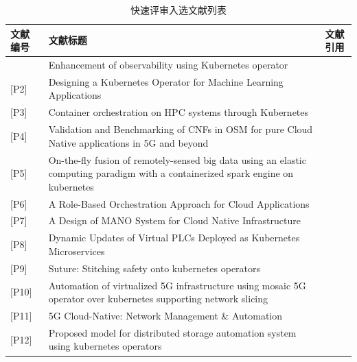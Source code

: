 {\footnotesize
\begin{longtable}[h]{m{40pt} m{280pt} m{40pt}<{\centering}}
    \caption[快速评审入选文献列表]{快速评审入选文献列表} \label{rapid_reviews} \\
        \toprule  
        \textbf{文献编号}&\textbf{文献标题}&\textbf{文献引用}\\
        \hline
        [P1]&Enhancement of observability using Kubernetes operator&\cite{Shenoy2022496}\\
        
        [P2]&Designing a Kubernetes Operator for Machine Learning Applications&\cite{kanso2021designing}\\
        
        [P3]&Container orchestration on HPC systems through Kubernetes&\cite{zhou2021container}\\
        
        [P4]&Validation and Benchmarking of CNFs in OSM for pure Cloud Native applications in 5G and beyond&\cite{pino2021validation}\\
        
        [P5]&On-the-fly fusion of remotely-sensed big data using an elastic computing paradigm with a containerized spark engine on kubernetes&\cite{huang2021fly}\\
        
        [P6]&A Role-Based Orchestration Approach for Cloud Applications&\cite{yue2021role}\\
        
        [P7]&A Design of MANO System for Cloud Native Infrastructure&\cite{lee2021design}\\
        
        [P8]&Dynamic Updates of Virtual PLCs Deployed as Kubernetes Microservices&\cite{koziolek2021dynamic}\\

        [P9]&Suture: Stitching safety onto kubernetes operators&\cite{mahajan2020suture}\\
        
        [P10]&Automation of virtualized 5G infrastructure using mosaic 5G operator over kubernetes supporting network slicing&\cite{wiranata2020automation}\\
        
        [P11]&5G Cloud-Native: Network Management \& Automation&\cite{arouk20205g}\\
        
        [P12]&Proposed model for distributed storage automation system using kubernetes operators&\cite{sharma2020proposed}\\
      

\end{longtable}}
